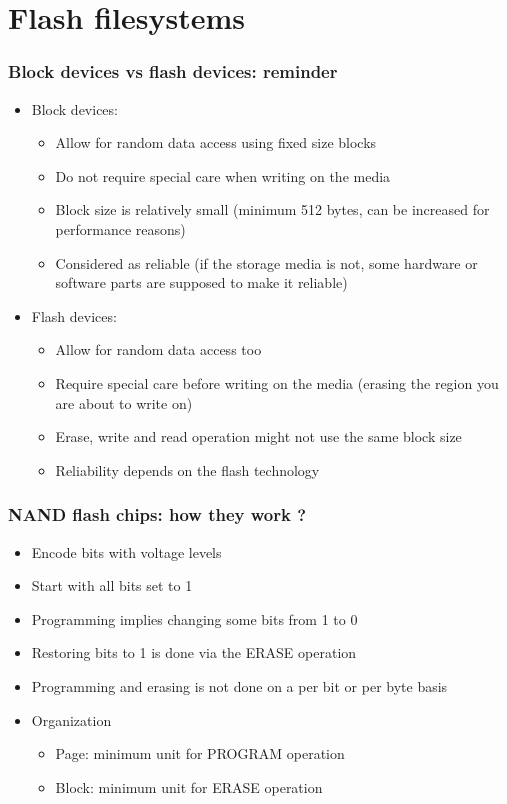 \section{Flash filesystems}

\begin{frame}
  \frametitle{Block devices vs flash devices: reminder}
  \begin{itemize}
  \item Block devices:
    \begin{itemize}
    \item Allow for random data access using fixed size blocks
    \item Do not require special care when writing on the media
    \item Block size is relatively small (minimum 512 bytes, can be
      increased for performance reasons)
    \item Considered as reliable (if the storage media is not, some
      hardware or software parts are supposed to make it reliable)
    \end{itemize}
  \item Flash devices:
    \begin{itemize}
    \item Allow for random data access too
    \item Require special care before writing on the media (erasing
      the region you are about to write on)
    \item Erase, write and read operation might not use the same block
      size
    \item Reliability depends on the flash technology
    \end{itemize}
  \end{itemize}
\end{frame}

\begin{frame}
  \frametitle{NAND flash chips: how they work ?}
  \begin{itemize}
  \item Encode bits with voltage levels
  \item Start with all bits set to 1
  \item Programming implies changing some bits from 1 to 0
  \item Restoring bits to 1 is done via the ERASE operation
  \item Programming and erasing is not done on a per bit or per byte
    basis
  \item Organization
    \begin{itemize}
    \item Page: minimum unit for PROGRAM operation
    \item Block: minimum unit for ERASE operation
    \end{itemize}
  \end{itemize}
\end{frame}


